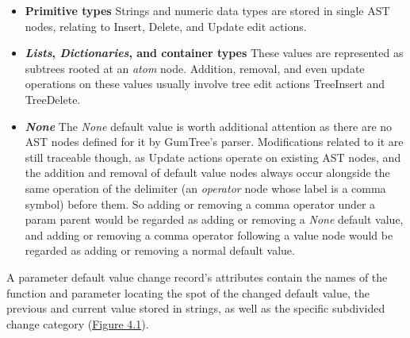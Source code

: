 \begin{itemize}
	\item \textbf{Primitive types} Strings and numeric data types are stored in single AST nodes, relating to Insert, Delete, and Update edit actions.
	\item \textbf{\textit{Lists}, \textit{Dictionaries}, and container types} These values are represented as subtrees rooted at an \textit{atom} node. Addition, removal, and even update operations on these values usually involve tree edit actions TreeInsert and TreeDelete.
	\item \textbf{\textit{None}} The \textit{None} default value is worth additional attention as there are no AST nodes defined for it by GumTree's parser. Modifications related to it are still traceable though, as Update actions operate on existing AST nodes, and the addition and removal of default value nodes always occur alongside the same operation of the delimiter (an \textit{operator} node whose label is a comma symbol) before them. So adding or removing a comma operator under a param parent would be regarded as adding or removing a \textit{None} default value, and adding or removing a comma operator following a value node would be regarded as adding or removing a normal default value.
\end{itemize}

A parameter default value change record's attributes contain the names of the function and parameter locating the spot of the changed default value, the previous and current value stored in strings, as well as the specific subdivided change category (\hyperref[fig:ccdetector-class-design]{Figure 4.1}).

